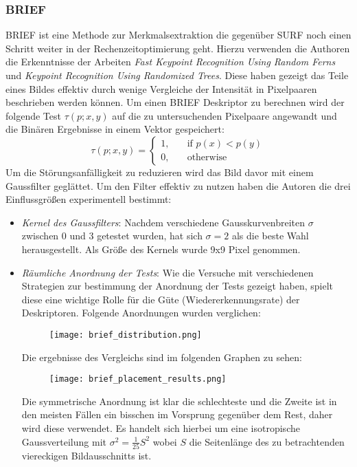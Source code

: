 \subsubsection{BRIEF}
BRIEF ist eine Methode zur Merkmalsextraktion die gegenüber SURF noch einen Schritt weiter in der Rechenzeitoptimierung geht. Hierzu verwenden die Authoren die Erkenntnisse der Arbeiten \emph{Fast Keypoint Recognition Using Random Ferns} und \emph{Keypoint Recognition Using Randomized Trees}.
Diese haben gezeigt das Teile eines Bildes effektiv durch wenige Vergleiche der Intensität in Pixelpaaren beschrieben werden können. 
Um einen BRIEF Deskriptor zu berechnen wird der folgende Test $\tau(p;x,y)$ auf die zu untersuchenden Pixelpaare angewandt und die Binären Ergebnisse in einem Vektor gespeichert:
\begin{equation}
\tau(p;x,y)=
\begin{cases}
1, & \quad \text{if } p(x) < p(y)\\
0, & \quad \text{otherwise}
\end{cases}
\end{equation}
Um die Störungsanfälligkeit zu reduzieren wird das Bild davor mit einem Gaussfilter geglättet.
Um den Filter effektiv zu nutzen haben die Autoren die drei Einflussgrößen experimentell bestimmt:
\begin{itemize}
\item \emph{Kernel des Gaussfilters}: Nachdem verschiedene Gausskurvenbreiten $\sigma$ zwischen 0 und 3 getestet wurden, hat sich $\sigma=2$ als die beste Wahl herausgestellt. Als Größe des Kernels wurde 9x9 Pixel genommen.

\item \emph{Räumliche Anordnung der Tests}: Wie die Versuche mit verschiedenen Strategien zur bestimmung der Anordnung der Tests gezeigt haben, spielt diese eine wichtige Rolle für die Güte (Wiedererkennungsrate) der Deskriptoren.
Folgende Anordnungen wurden verglichen:
\begin{figure}[h]
\texttt{[image: brief\_distribution.png]}
\centering
\end{figure}

Die ergebnisse des Vergleichs sind im folgenden Graphen zu sehen:
\begin{figure}[h]
\texttt{[image: brief\_placement\_results.png]}
\centering
\end{figure}
Die symmetrische Anordnung ist klar die schlechteste und die Zweite ist in den meisten Fällen ein bisschen im Vorsprung gegenüber dem Rest, daher wird diese verwendet.
Es handelt sich hierbei um eine isotropische Gaussverteilung mit $\sigma^2=\frac{1}{25}S^2$ wobei $S$ die Seitenlänge des zu betrachtenden viereckigen Bildausschnitts ist.

\end{itemize}

